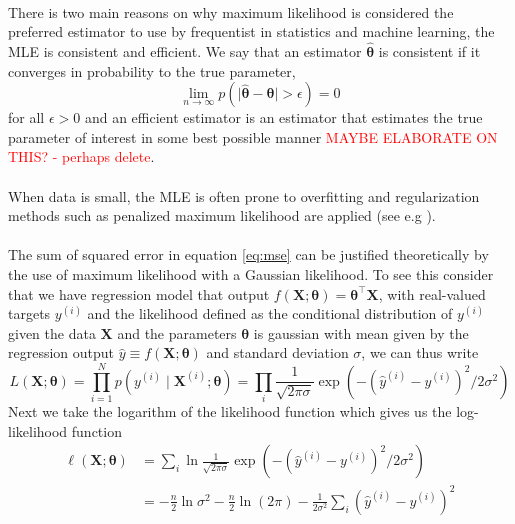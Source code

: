 \\
There is two main reasons on why maximum likelihood is considered the preferred estimator to use by frequentist in statistics and machine learning, the MLE is consistent and efficient. We say that an estimator $\hat{\boldsymbol{\theta}}$ is consistent if it converges in probability to the true parameter,
\begin{equation*}
    \lim_{n \rightarrow \infty} p\left(\mid\hat{\boldsymbol{\theta}}-\boldsymbol{\theta}\mid > \epsilon\right)=0
\end{equation*}
for all $\epsilon>0$ and an efficient estimator is an estimator that estimates the true parameter of interest in some best possible manner \textcolor{red}{MAYBE ELABORATE ON THIS? - perhaps delete}. \\
\\
When data is small, the MLE is often prone to overfitting and regularization methods such as penalized maximum likelihood are applied (see e.g \cite{hastie01statisticallearning}).\\
\\
The sum of squared error in equation \ref{eq:mse} can be justified theoretically by the use of maximum likelihood with a Gaussian likelihood.
To see this consider that we have regression model that output $f(\mathbf{X};\boldsymbol{\theta})=\boldsymbol{\theta}^\top\mathbf{X}$, with real-valued targets $y^{(i)}$ and the likelihood defined as the conditional distribution of $y^{(i)}$ given the data $\mathbf{X}$ and the parameters $\boldsymbol{\theta}$ is gaussian with mean given by the regression output $\hat{y}\equiv f(\mathbf{X};\boldsymbol{\theta})$ and standard deviation $\sigma$, we can thus write
\begin{equation*}
    L(\mathbf{X};\boldsymbol{\theta})=\prod_{i=1}^{N} p\left(y^{(i)} \mid \mathbf{X}^{(i)} ; \boldsymbol{\theta}\right)=\prod_i\frac{1}{\sqrt{2\pi\sigma}}\exp\left(-(\hat{y}^{(i)}-y^{(i)})^2/2\sigma^2\right)
\end{equation*}
Next we take the
logarithm of the likelihood function which gives us the log-likelihood function
\begin{equation*}
\begin{split}
        \ell(\mathbf{X};\boldsymbol{\theta})&=\sum_i\ln\frac{1}{\sqrt{2\pi\sigma}}\exp\left(-(\hat{y}^{(i)}-y^{(i)})^2/2\sigma^2\right)\\
        &=-\frac{n}{2} \ln \sigma^{2}-\frac{n}{2} \ln (2 \pi)-\frac{1}{2 \sigma^{2}} \sum_{i}\left(\hat{y}^{(i)}-y^{(i)}\right)^{2}
\end{split}
\end{equation*}

